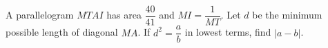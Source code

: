 A parallelogram $MTAI$ has area $\dfrac{40}{41}$ and $MI=\dfrac{1}{MT}$. Let $d$ be the minimum possible length of diagonal $MA$. If $d^2=\dfrac{a}{b}$ in lowest terms, find $|a-b|$.
